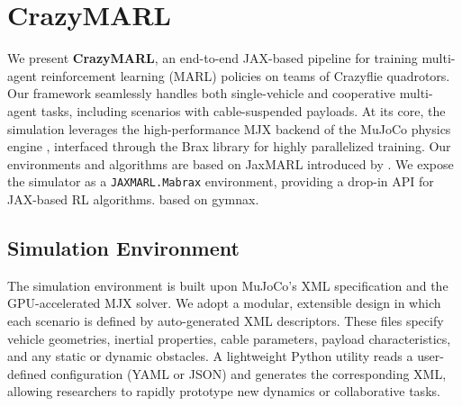 \section{CrazyMARL}
We present \textbf{CrazyMARL}, an end-to-end JAX-based pipeline for training multi-agent reinforcement learning (MARL) policies on teams of Crazyflie quadrotors. Our framework seamlessly handles both single-vehicle and cooperative multi-agent tasks, including scenarios with cable-suspended payloads. At its core, the simulation leverages the high-performance MJX backend of the MuJoCo physics engine \cite{todorov_mujoco_2012}, interfaced through the Brax library for highly parallelized training. Our environments and algorithms are based on JaxMARL introduced by \autocite{flair2023jaxmarl}. We expose the simulator as a \texttt{JAXMARL.Mabrax} environment, providing a drop-in API for JAX-based RL algorithms.
\autocite{gymnax2022github} based on gymnax.
\subsection{Simulation Environment}
The simulation environment is built upon MuJoCo's XML specification and the GPU-accelerated MJX solver. We adopt a modular, extensible design in which each scenario is defined by auto-generated XML descriptors. These files specify vehicle geometries, inertial properties, cable parameters, payload characteristics, and any static or dynamic obstacles. A lightweight Python utility reads a user-defined configuration (YAML or JSON) and generates the corresponding XML, allowing researchers to rapidly prototype new dynamics or collaborative tasks. 
